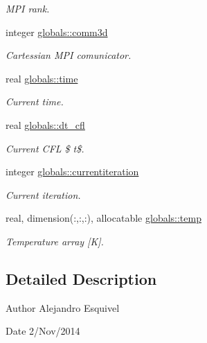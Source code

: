 \begin{DoxyCompactItemize}
\begin{DoxyCompactList}\small\item\em M\+P\+I rank. \end{DoxyCompactList}\item 
\hypertarget{namespaceglobals_a4bc8f1b5670efd802d57dce2c385b6d9}{}integer \hyperlink{namespaceglobals_a4bc8f1b5670efd802d57dce2c385b6d9}{globals\+::comm3d}\label{namespaceglobals_a4bc8f1b5670efd802d57dce2c385b6d9}

\begin{DoxyCompactList}\small\item\em Cartessian M\+P\+I comunicator. \end{DoxyCompactList}\item 
\hypertarget{namespaceglobals_acc5c9a03b08561f9eeb530eb65221dbb}{}real \hyperlink{namespaceglobals_acc5c9a03b08561f9eeb530eb65221dbb}{globals\+::time}\label{namespaceglobals_acc5c9a03b08561f9eeb530eb65221dbb}

\begin{DoxyCompactList}\small\item\em Current time. \end{DoxyCompactList}\item 
\hypertarget{namespaceglobals_a1599fd11dcd5dfa9104003de3a2d03e5}{}real \hyperlink{namespaceglobals_a1599fd11dcd5dfa9104003de3a2d03e5}{globals\+::dt\+\_\+cfl}\label{namespaceglobals_a1599fd11dcd5dfa9104003de3a2d03e5}

\begin{DoxyCompactList}\small\item\em Current C\+F\+L \$ t\$. \end{DoxyCompactList}\item 
\hypertarget{namespaceglobals_a6966cf52ad4f442a7fe69efa6d5c0bee}{}integer \hyperlink{namespaceglobals_a6966cf52ad4f442a7fe69efa6d5c0bee}{globals\+::currentiteration}\label{namespaceglobals_a6966cf52ad4f442a7fe69efa6d5c0bee}

\begin{DoxyCompactList}\small\item\em Current iteration. \end{DoxyCompactList}\item 
\hypertarget{namespaceglobals_a6942102ba8bd15a3350901de0b99bafa}{}real, dimension(\+:,\+:,\+:), allocatable \hyperlink{namespaceglobals_a6942102ba8bd15a3350901de0b99bafa}{globals\+::temp}\label{namespaceglobals_a6942102ba8bd15a3350901de0b99bafa}

\begin{DoxyCompactList}\small\item\em Temperature array \mbox{[}K\mbox{]}. \end{DoxyCompactList}\end{DoxyCompactItemize}


\subsection{Detailed Description}
\begin{DoxyAuthor}{Author}
Alejandro Esquivel 
\end{DoxyAuthor}
\begin{DoxyDate}{Date}
2/\+Nov/2014 
\end{DoxyDate}

